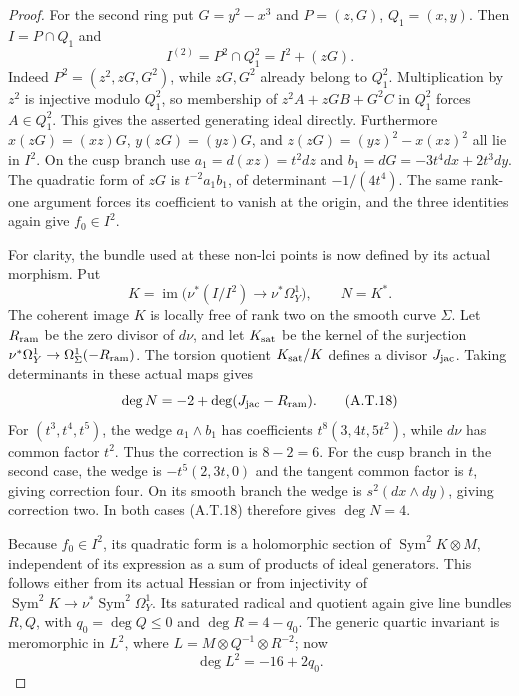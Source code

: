 \begin{proof}
For the second ring put $G=y^2-x^3$ and
$P=(z,G)$, $Q_1=(x,y)$. Then $I=P\cap Q_1$ and
\[
 I^{(2)}=P^2\cap Q_1^2=I^2+(zG).                \tag{A.T.17}
\]
Indeed $P^2=(z^2,zG,G^2)$, while $zG,G^2$ already
belong to $Q_1^2$. Multiplication by $z^2$ is
injective modulo $Q_1^2$, so membership of
$z^2A+zGB+G^2C$ in $Q_1^2$ forces $A\in Q_1^2$.
This gives the asserted generating ideal directly.
Furthermore
$x(zG)=(xz)G$, $y(zG)=(yz)G$, and
$z(zG)=(yz)^2-x(xz)^2$ all lie in $I^2$.
On the cusp branch use $a_1=d(xz)=t^2dz$ and
$b_1=dG=-3t^4dx+2t^3dy$.
The quadratic form of $zG$ is $t^{-2}a_1b_1$,
of determinant $-1/(4t^4)$. The same rank-one
argument forces its coefficient to vanish at the
origin, and the three identities again give
$f_0\in I^2$.

For clarity, the bundle used at these non-lci points
is now defined by its actual morphism. Put
\[
 K=\operatorname{im}\bigl(\nu^*(I/I^2)
                         \longrightarrow\nu^*\Omega_Y^1\bigr),
 \qquad N=K^*.
\]
The coherent image $K$ is locally free of rank two
on the smooth curve $\Sigma$. Let $R_{\rm ram}$ be
the zero divisor of $d\nu$, and let $K_{\rm sat}$
be the kernel of the surjection
$\nu^*\Omega_Y^1\to\Omega_\Sigma^1(-R_{\rm ram})$.
The torsion quotient $K_{\rm sat}/K$ defines a divisor
$J_{\rm jac}$. Taking determinants in these actual
maps gives
\[
 \deg N=-2+\deg(J_{\rm jac}-R_{\rm ram}).         \tag{A.T.18}
\]
For $(t^3,t^4,t^5)$, the wedge $a_1\wedge b_1$
has coefficients $t^8(3,4t,5t^2)$, while $d\nu$
has common factor $t^2$. Thus the correction is
$8-2=6$. For the cusp branch in the second case,
the wedge is $-t^5(2,3t,0)$ and the tangent common
factor is $t$, giving correction four. On its
smooth branch the wedge is $s^2(dx\wedge dy)$,
giving correction two. In both cases (A.T.18)
therefore gives $\deg N=4$.

Because $f_0\in I^2$, its quadratic form is a
holomorphic section of $\operatorname{Sym}^2K\otimes M$,
independent of its expression as a sum of products
of ideal generators. This follows either from its
actual Hessian or from injectivity of
$\operatorname{Sym}^2K\to\nu^*\operatorname{Sym}^2\Omega_Y^1$.
Its saturated radical and quotient again give line
bundles $R,Q$, with $q_0=\deg Q\le0$ and
$\deg R=4-q_0$. The generic quartic invariant
is meromorphic in $L^2$, where
$L=M\otimes Q^{-1}\otimes R^{-2}$; now
\[
                        \deg L^2=-16+2q_0.        \tag{A.T.19}
\]


\end{proof}
